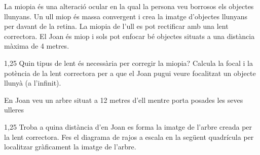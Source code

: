 La miopia és una alteració ocular en la qual la persona veu borrosos els objectes llunyans. Un ull miop és massa convergent i crea la imatge d'objectes llunyans per davant de la retina. La miopia de l'ull es pot rectificar amb una lent correctora. El Joan és miop i sols pot enfocar bé objectes situats a una distància màxima de 4 metres.

\begin{apartat}{1,25}
Quin tipus de lent és necessària per corregir la miopia? Calcula la focal i la potència de la lent correctora per a que el Joan pugui veure focalitzat un objecte llunyà (a l'infinit).
\end{apartat}

En Joan veu un arbre situat a 12 metres d'ell mentre porta posades les seves ulleres

\begin{apartat}{1,25}
Troba a quina distància d'en Joan es forma la imatge de l'arbre creada per la lent correctora. Fes el diagrama de rajos a escala en la següent quadrícula per localitzar gràficament la imatge de l'arbre.
\end{apartat}

